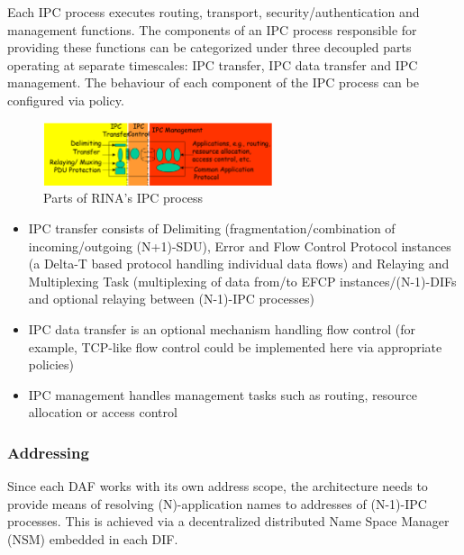                Each IPC process executes routing, transport, security/authentication and management functions. The components of an IPC process responsible for providing these functions can be categorized under three decoupled parts operating at separate timescales: IPC transfer, IPC data transfer and IPC management. The behaviour of each component of the IPC process can be configured via policy.

                \begin{figure}[H]
                    \begin{center}
                        \includegraphics[width=0.6\textwidth]{fig/archs_rina-ipcp.png}
                      \caption{Parts of RINA's IPC process}
                      \label{fig:rina_ipcp}
                    \end{center}
                \end{figure}

                \begin{itemize}
                    \item IPC transfer consists of Delimiting (fragmentation/combination of incoming/outgoing (N+1)-SDU), Error and Flow Control Protocol instances (a Delta-T based protocol handling individual data flows) and Relaying and Multiplexing Task (multiplexing of data from/to EFCP instances/(N-1)-DIFs and optional relaying between (N-1)-IPC processes)
                    \item IPC data transfer is an optional mechanism handling flow control (for example, TCP-like flow control could be implemented here via appropriate policies)
                    \item IPC management handles management tasks such as routing, resource allocation or access control
                \end{itemize}


            \subsubsection{Addressing}

                Since each DAF works with its own address scope, the architecture needs to provide means of resolving (N)-application names to addresses of (N-1)-IPC processes. This is achieved via a decentralized distributed Name Space Manager (NSM) embedded in each DIF.

